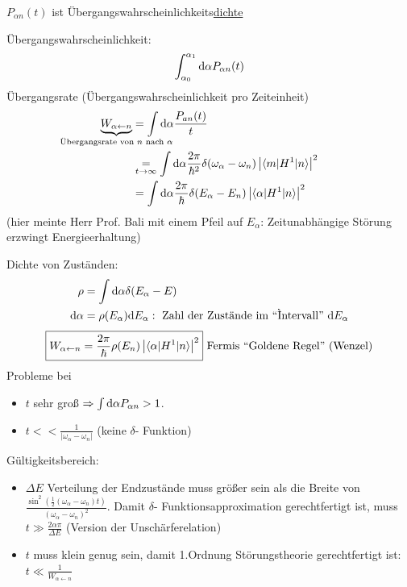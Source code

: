 	$P_{\alpha n}(t)$ ist Übergangswahrscheinlichkeits\underline{dichte}
	
	Übergangswahrscheinlichkeit: 
		\begin{equation*}
			\int_{\alpha_0}^{\alpha_1} \mathrm{d} \alpha P_{\alpha n} (t)
		\end{equation*}
	Übergangsrate (Übergangswahrscheinlichkeit pro Zeiteinheit)
		\begin{align*}
			\underbrace{W_{\alpha \leftarrow n}}_{
				\mathclap{\text{Übergangsrate von~} n \text{~nach~} \alpha}}
			&= \int \diff \alpha \frac{P_{an}(t)}{t} \\
			&\underset{t \rightarrow \infty}{=} 
			\int \diff \alpha \frac{2 \pi}{\hbar^2} 
			\delta(\omega_\alpha - \omega_n) \left| \braket{m | H^1 | n}\right|^2 \\
			&= \int \diff \alpha \frac{2 \pi}{\hbar} 
			\delta (E_\alpha - E_n) \left| \braket{\alpha | H^1 | n}\right|^2
		\end{align*}
	(hier meinte Herr Prof. Bali mit einem Pfeil auf $E_\alpha$: Zeitunabhängige Störung erzwingt Energieerhaltung)
	
	Dichte von Zuständen:
		\begin{align*}
			\rho &= \int \mathrm{d} \alpha \delta (E_\alpha - E)  \\
			\mathrm{d} \alpha &= \rho(E_\alpha) \mathrm{d} E_\alpha: \text{~Zahl der Zustände im ``Ìntervall''~} \mathrm{d} E_\alpha
		\end{align*}
		\begin{align*}
			\boxed{
				W_{\alpha \leftarrow n} = \frac{2 \pi}{\hbar} \rho(E_n)
					\left| \braket{\alpha | H^1 | n}\right|^2
				}
			\text{~Fermis ``Goldene Regel'' (Wenzel)}
		\end{align*}
	Probleme bei 
		\begin{itemize}
			\item $t$ sehr groß $\Rightarrow \int \mathrm{d} \alpha P_{\alpha n} > 1$.
			\item $t  << \frac{1}{|\omega_\alpha - \omega_n|}$ (keine $\delta$- Funktion)   
		\end{itemize}	
	Gültigkeitsbereich:
		\begin{itemize}
			\item $\Delta E$ Verteilung der Endzustände muss größer sein als die Breite von $\frac{\sin^2 (\frac{1}{2}(\omega_\alpha - \omega_n) t)}{(\omega_\alpha - \omega_n)^2}$. Damit $\delta$- Funktionsapproximation gerechtfertigt ist, muss $t \gg \frac{2 \alpha \pi}{\Delta E}$ (Version der Unschärferelation)
			\item $t$ muss klein genug sein, damit 1.Ordnung Störungstheorie gerechtfertigt ist:
			\\ $t \ll \frac{1}{W_{\alpha \leftarrow n}}$
		\end{itemize}